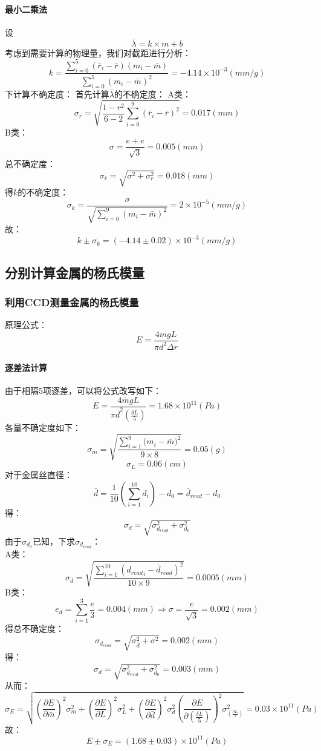 \documentclass{ctexart}
\begin{document}
\paragraph{最小二乘法}
设$$\bar{\lambda}=k\times m+b$$
考虑到需要计算的物理量，我们对截距进行分析：
$$k=\frac{\sum\limits_{i=0}^5{(\bar{r}_i-\bar{r})(m_i-\bar{m})}}{\sum\limits_{i=0}^5{(m_i-\bar{m})^2}}=-4.14\times 10^{-3}(mm/g)$$
下计算不确定度：
首先计算$\bar{\lambda}$的不确定度：
A类：$$\sigma_r =\sqrt{\frac{1-r^2}{6-2}\sum\limits_{i=0}^9{(\bar{r}_i-\bar{r})^2}}=0.017(mm)$$
B类：$$\sigma=\frac{e+e}{\sqrt{3}}=0.005(mm)$$
总不确定度：$$\sigma_{\bar{r}}=\sqrt{\sigma^2+\sigma_r^2}=0.018(mm)$$
得$k$的不确定度：
$$\sigma_k=\frac{\sigma}{\sqrt{\sum\limits_{i=0}^9{(m_i-\bar{m})^2}}}=2\times10^{-5}(mm/g)$$
故：
$$k\pm \sigma_k=(-4.14\pm 0.02 )\times 10^{-3}(mm/g)$$
\subsection{分别计算金属的杨氏模量}
\subsubsection{利用CCD测量金属的杨氏模量}
原理公式：
$$E=\frac{4mgL}{\pi d^2 \Delta r}$$
\paragraph{逐差法计算}
由于相隔5项逐差，可以将公式改写如下：
$$E=\frac{4\bar{m}gL}{\pi \bar{d}^2 (\frac{\delta L}5)}=1.68\times 10^{11}(Pa)$$
各量不确定度如下：
$$\sigma_m=\sqrt{\frac{\sum\limits_{i=1}^9{(m_i-\bar{m}})^2}{9\times 8}}=0.05(g)$$
$$\sigma_L=0.06(cm)$$
对于金属丝直径：
$$\bar{d}=\frac{1}{10}(\sum_{i=1}^{10}{d_i})-d_0=\bar{d}_{read}-d_0$$
得：
$$\sigma_d=\sqrt{\sigma_{d_{read}}^2+\sigma_{d_0}^2}$$
由于$\sigma_{d_0}$已知，下求$\sigma_{d_{read}}$：
\\
A类：$$\sigma_{\bar{d}}=\sqrt{\frac{\sum\limits_{i=1}^{10}{({d_{read}}_i-\bar{d}_{read})^2}}{10\times9}}=0.0005(mm)$$
B类：$$e_d=\sum\limits_{i=1}^3{\frac{e}3}=0.004(mm)\Rightarrow \sigma=\frac{e}{\sqrt{3}}=0.002(mm)$$
得总不确定度：$$\sigma_{d_{read}}=\sqrt{\sigma_{\bar{d}}^2+\sigma^2}=0.002(mm)$$
得：$$\sigma_d=\sqrt{\sigma_{d_{read}}^2+\sigma_{d_0}^2}=0.003(mm)$$
从而：
$$\sigma_E=\sqrt{(\frac{\partial E}{\partial \bar{m}})^2\sigma_m^2+(\frac{\partial E}{\partial L})^2\sigma_L^2+(\frac{\partial E}{\partial \bar{d}})^2\sigma_d^2(\frac{\partial E}{\partial{(\frac{\delta L}5)} })^2\sigma_{(\frac{\delta L}5)}^2}=0.03\times 10^{11}(Pa)$$
故：$$E\pm \sigma_E=(1.68\pm 0.03)\times 10^{11}(Pa)$$
\end{document}

